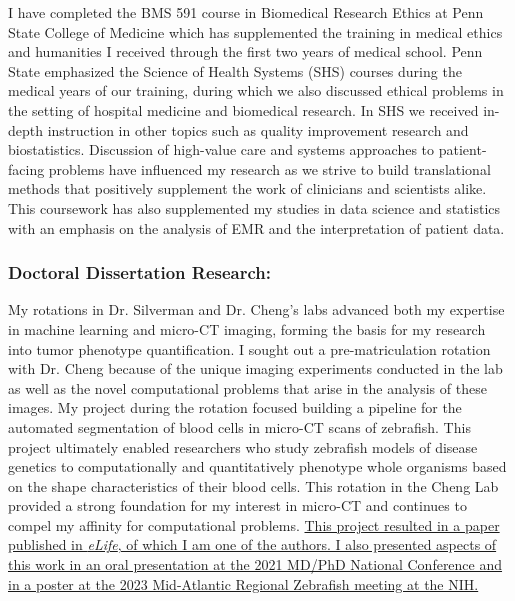 \documentclass{NIHGrant}
\begin{document}
I have completed the BMS 591 course in Biomedical Research Ethics at Penn State College of Medicine which has supplemented the training in medical ethics and humanities I received through the first two years of medical school. Penn State emphasized the Science of Health Systems (SHS) courses during the medical years of our training, during which we also discussed ethical problems in the setting of hospital medicine and biomedical research. In SHS we received in-depth instruction in other topics such as quality improvement research and biostatistics. Discussion of high-value care and systems approaches to patient-facing problems have influenced my research as we strive to build translational methods that positively supplement the work of clinicians and scientists alike. This coursework has also supplemented my studies in data science and statistics with an emphasis on the analysis of EMR and the interpretation of patient data.

\subsubsection*{Doctoral Dissertation Research:}
My rotations in Dr. Silverman and Dr. Cheng's labs advanced both my expertise in machine learning and micro-CT imaging, forming the basis for my research into tumor phenotype quantification. I sought out a pre-matriculation rotation with Dr. Cheng because of the unique imaging experiments conducted in the lab as well as the novel computational problems that arise in the analysis of these images. My project during the rotation focused building a pipeline for the automated segmentation of blood cells in micro-CT scans of zebrafish. This project ultimately enabled researchers who study zebrafish models of disease genetics to computationally and quantitatively phenotype whole organisms based on the shape characteristics of their blood cells. This rotation in the Cheng Lab provided a strong foundation for my interest in micro-CT and continues to compel my affinity for computational problems. \uline{This project resulted in a paper published in \textit{eLife}, of which I am one of the authors. I also presented aspects of this work in an oral presentation at the 2021 MD/PhD National Conference and in a poster at the 2023 Mid-Atlantic Regional Zebrafish meeting at the NIH.}
\end{document}
